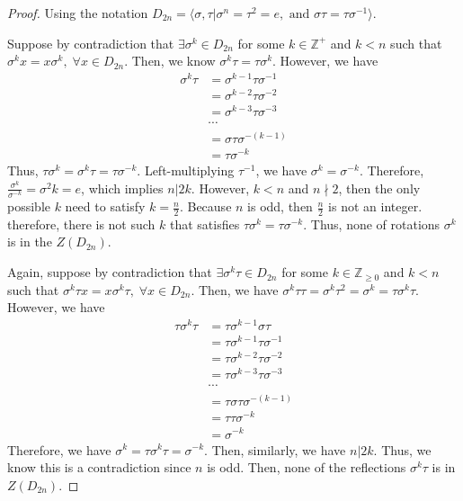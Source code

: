 \begin{answer}
    \begin{proof}
        Using the notation $D_{2n} = \langle \sigma, \tau \lvert \sigma^n = \tau^2 = e, \text{ and } \sigma\tau = \tau\sigma^{-1}\rangle$.
    
        Suppose by contradiction that $\exists \sigma^k \in D_{2n}$ for some $k \in \mathbb{Z}^{+}$ and $k < n$ such that $\sigma^k x = x \sigma^k,\; \forall x \in D_{2n}$. Then, we know $\sigma^k \tau = \tau \sigma^k$. However, we have
        \begin{equation}
            \begin{aligned}
                \sigma^k\tau &= \sigma^{k-1}\tau\sigma^{-1}\\
                &= \sigma^{k-2}\tau\sigma^{-2}\\
                &= \sigma^{k-3}\tau\sigma^{-3}\\
                &\cdots\\
                &= \sigma\tau\sigma^{-(k-1)}\\
                &= \tau\sigma^{-k}
            \end{aligned}
        \end{equation}
        Thus, $\tau\sigma^k = \sigma^k\tau = \tau\sigma^{-k}$. Left-multiplying $\tau^{-1}$, we have $\sigma^k = \sigma^{-k}$. Therefore, $\tfrac{\sigma^k}{\sigma^{-k}} = \sigma^2k = e$, which implies $n \lvert 2k$. However, $k < n$ and $n \nmid 2$, then the only possible $k$ need to satisfy $k = \tfrac{n}{2}$. Because $n$ is odd, then $\tfrac{n}{2}$ is not an integer. therefore, there is not such $k$ that satisfies $\tau\sigma^k = \tau\sigma^{-k}$. Thus, none of rotations $\sigma^k$ is in the $Z(D_{2n})$.
        
        Again, suppose by contradiction that $\exists \sigma^k\tau \in D_{2n}$ for some $k \in \mathbb{Z}_{\geq 0}$ and $k < n$ such that $\sigma^k\tau x = x \sigma^k\tau, \; \forall x \in D_{2n}$. Then, we have $\sigma^k\tau\tau = \sigma^k\tau^2 = \sigma^k = \tau\sigma^k\tau$. However, we have
        \begin{equation}
            \begin{aligned}
                \tau\sigma^k\tau &= \tau\sigma^{k-1}\sigma\tau\\
                &= \tau\sigma^{k-1}\tau\sigma^{-1}\\
                &= \tau\sigma^{k-2}\tau\sigma^{-2}\\
                &= \tau\sigma^{k-3}\tau\sigma^{-3}\\
                &\cdots\\
                &= \tau\sigma\tau\sigma^{-(k-1)}\\
                &= \tau\tau\sigma^{-k}\\
                &= \sigma^{-k}
            \end{aligned}
        \end{equation}
        Therefore, we have $\sigma^k = \tau\sigma^k\tau = \sigma^{-k}$. Then, similarly, we have $n \lvert 2k$. Thus, we know this is a contradiction since $n$ is odd. Then, none of the reflections $\sigma^k\tau$ is in $Z(D_{2n})$.
        

\end{proof}
\end{answer}
